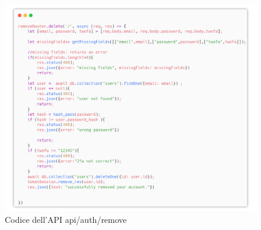 \documentclass{report}
\begin{document}
\begin{figure}[H]
	\centering\includegraphics[width=1\textwidth]{images/microservizio-autenticazione/remove-carbon.png}
	Codice dell'API api/auth/remove
\end{figure}
\end{document}
